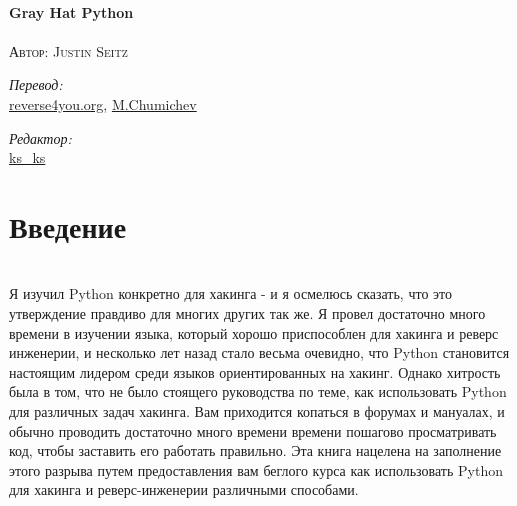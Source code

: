 \documentclass[12pt, a4paper, oneside]{book}
\begin{document}
\begin{titlepage}
\begin{center}
\HRule \\[0.4cm]
{ \huge \bfseries Gray Hat Python}\\[0.4cm]
\HRule \\[1.5cm]
\textsc{\Large Автор: Justin Seitz}\\[0.5cm]
\begin{minipage}{0.4\textwidth}
\begin{flushleft} \large
\emph{Перевод: }\\
\href{http://reverse4you.org}{reverse4you.org}, \href{http://chumichev.blogspot.com/}{M.Chumichev}
\end{flushleft}
\end{minipage}
\begin{minipage}{0.4\textwidth}
\begin{flushright} \large
\emph{Редактор:} \\
\href{http://vk.com/woodooshaman}{ks\_ks}
\end{flushright}
\end{minipage}
\vfill
\end{center}
\end{titlepage}


\section*{Введение}\\

Я изучил Python конкретно для хакинга - и я осмелюсь сказать, что это утверждение правдиво для многих других так же. Я провел достаточно много времени в изучении языка, который хорошо приспособлен для хакинга и реверс инженерии, и несколько лет назад стало весьма очевидно, что Python становится настоящим лидером среди языков ориентированных на хакинг. Однако хитрость была в том, что не было стоящего руководства по теме, как использовать Python для различных задач хакинга. Вам приходится копаться в форумах и мануалах, и обычно проводить достаточно много времени времени пошагово просматривать код, чтобы заставить его работать правильно. Эта книга нацелена на заполнение этого разрыва путем предоставления вам беглого курса как использовать Python для хакинга и реверс-инженерии различными способами.\\
\end{document}
